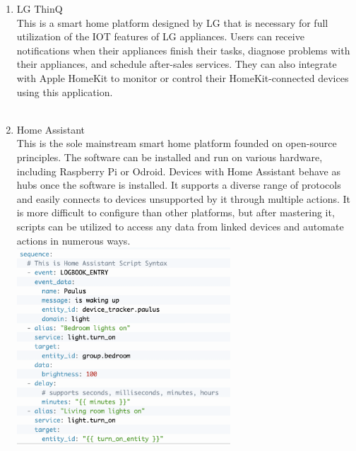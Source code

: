 \documentclass[11pt, conference]{IEEEtran}
\begin{document}
\begin{enumerate}[label=\alph*]
    \item LG ThinQ\\
    This is a smart home platform designed by LG that is necessary for full utilization of the IOT features of LG appliances. Users can receive notifications when their appliances finish their tasks, diagnose problems with their appliances, and schedule after-sales services. They can also integrate with Apple HomeKit to monitor or control their HomeKit-connected devices using this application.\\\\

    \item Home Assistant\\
    This is the sole mainstream smart home platform founded on open-source principles. The software can be installed and run on various hardware, including Raspberry Pi or Odroid. Devices with Home Assistant behave as hubs once the software is installed. It supports a diverse range of protocols and easily connects to devices unsupported by it through multiple actions. It is more difficult to configure than other platforms, but after mastering it, scripts can be utilized to access any data from linked devices and automate actions in numerous ways.\\

    \includegraphics[width=8cm]{imgs/ha_script_example.png}\\\\
    \end{enumerate}
\end{document}
